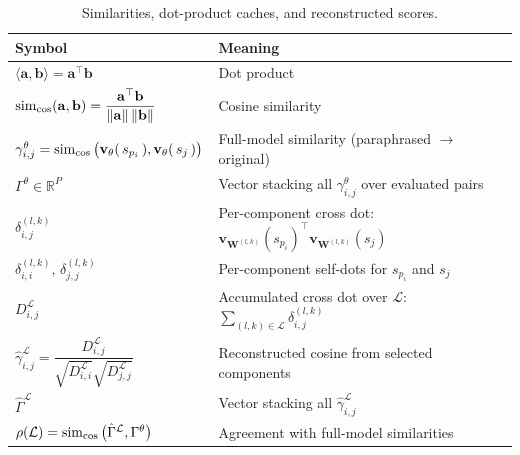 \begin{table}[htb!]
    \centering
    \small
    \begin{tabular}{ll}
        \textbf{Symbol} & \textbf{Meaning} \\
        \hline
        $\langle \mathbf{a},\mathbf{b}\rangle=\mathbf{a}^{\top}\mathbf{b}$ & Dot product \\
        $\operatorname{sim}_{\cos}(\mathbf{a},\mathbf{b})=\dfrac{\mathbf{a}^{\top}\mathbf{b}}{\|\mathbf{a}\|\,\|\mathbf{b}\|}$ & Cosine similarity \\
        $\gamma_{i,j}^{\theta}=\operatorname{sim}_{\cos}\big(\mathbf{v}_{\theta}(\,s_{p_i}\,),\mathbf{v}_{\theta}(\,s_{j}\,)\big)$ & Full-model similarity (paraphrased $\to$ original) \\
        $\Gamma^\theta\in\mathbb{R}^{P}$ & Vector stacking all $\gamma_{i,j}^{\theta}$ over evaluated pairs \\
        $\delta^{(l,k)}_{i,j}$ & Per-component cross dot: $\mathbf{v}_{\mathbf{W}^{(l,k)}}(s_{p_i})^{\top}\mathbf{v}_{\mathbf{W}^{(l,k)}}(s_j)$ \\
        $\delta^{(l,k)}_{i,i},\,\delta^{(l,k)}_{j,j}$ & Per-component self-dots for $s_{p_i}$ and $s_j$ \\
        $D^{\mathcal{L}}_{i,j}$ & Accumulated cross dot over $\mathcal{L}$: $\sum_{(l,k)\in\mathcal{L}}\delta^{(l,k)}_{i,j}$ \\
        $\hat{\gamma}^{\mathcal{L}}_{i,j}=\dfrac{D^{\mathcal{L}}_{i,j}}{\sqrt{D^{\mathcal{L}}_{i,i}}\sqrt{D^{\mathcal{L}}_{j,j}}}$ & Reconstructed cosine from selected components \\
        $\hat{\Gamma}^{\mathcal{L}}$ & Vector stacking all $\hat{\gamma}^{\mathcal{L}}_{i,j}$ \\
        $\rho(\mathcal{L})=\operatorname{sim}_{\cos}\big(\hat{\Gamma}^{\mathcal{L}},\Gamma^\theta\big)$ & Agreement with full-model similarities \\
    \end{tabular}
    \caption{Similarities, dot-product caches, and reconstructed scores.}
    \label{tab:nomenclature-sims}
\end{table}

